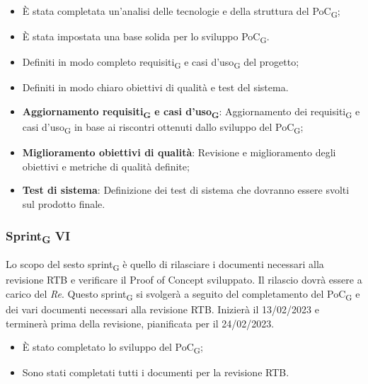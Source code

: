 \:
\begin{itemize}
	\item È stata completata un'analisi delle tecnologie e della struttura del PoC\textsubscript{G};
	\item È stata impostata una base solida per lo sviluppo PoC\textsubscript{G}.
\end{itemize}

\:
\begin{itemize}
	\item Definiti in modo completo requisiti\textsubscript{G} e casi d'uso\textsubscript{G} del progetto;
	\item Definiti in modo chiaro obiettivi di qualità e test del sistema.
\end{itemize}

\:
\begin{itemize}
	\item \textbf{Aggiornamento requisiti\textsubscript{G} e casi d'uso\textsubscript{G}}: Aggiornamento dei requisiti\textsubscript{G} e casi d'uso\textsubscript{G} in base ai riscontri ottenuti dallo sviluppo del PoC\textsubscript{G};
	\item \textbf{Miglioramento obiettivi di qualità}: Revisione e miglioramento degli obiettivi e metriche di qualità definite;
	\item \textbf{Test di sistema}: Definizione dei test di sistema che dovranno essere svolti sul prodotto finale.
\end{itemize}

\subsubsection{Sprint\textsubscript{G} VI}
Lo scopo del sesto sprint\textsubscript{G} è quello di rilasciare i documenti necessari alla revisione RTB e verificare il Proof of Concept sviluppato. Il rilascio dovrà essere a carico del \textit{Re}.
Questo sprint\textsubscript{G} si svolgerà a seguito del completamento del PoC\textsubscript{G} e dei vari documenti necessari alla revisione RTB. Inizierà il 13/02/2023 e terminerà prima della revisione, pianificata per il 24/02/2023.

\:
\begin{itemize}
	\item È stato completato lo sviluppo del PoC\textsubscript{G};
	\item Sono stati completati tutti i documenti per la revisione RTB.
\end{itemize}

